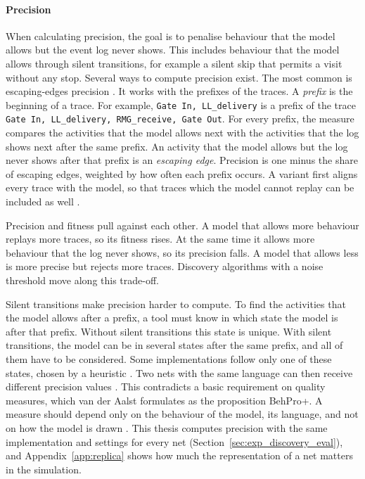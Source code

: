 \paragraph{Precision}
When calculating precision, the goal is to penalise behaviour that the model
allows but the event log never shows. This includes behaviour that the model
allows through silent transitions, for example a silent skip that permits a
visit without any stop. Several ways to compute precision exist. The most common
is escaping-edges precision \cite{MunozGama2010FreshLook}. It works with the
prefixes of the traces. A \emph{prefix} is the beginning of a trace. For
example, \texttt{Gate In, LL\_delivery} is a prefix of the trace \texttt{Gate In,
LL\_delivery, RMG\_receive, Gate Out}. For every prefix, the measure compares the
activities that the model allows next with the activities that the log shows
next after the same prefix. An activity that the model allows but the log never
shows after that prefix is an \emph{escaping edge}. Precision is one minus the
share of escaping edges, weighted by how often each prefix occurs. A variant
first aligns every trace with the model, so that traces which the model cannot
replay can be included as well \cite{Adriansyah2015Precision}.

Precision and fitness pull against each other. A model that allows more
behaviour replays more traces, so its fitness rises. At the same time it allows
more behaviour that the log never shows, so its precision falls. A model that
allows less is more precise but rejects more traces. Discovery algorithms with a
noise threshold move along this trade-off.

Silent transitions make precision harder to compute. To find the activities
that the model allows after a prefix, a tool must know in which state the model
is after that prefix. Without silent transitions this state is unique. With
silent transitions, the model can be in several states after the same prefix,
and all of them have to be considered. Some implementations follow only one of
these states, chosen by a heuristic \cite{MunozGama2010FreshLook}. Two nets with
the same language can then receive different precision values
\cite{Tax2018Imprecisions}. This contradicts a basic requirement on quality
measures, which van der Aalst formulates as the proposition BehPro+. A measure
should depend only on the behaviour of the model, its language, and not on how
the model is drawn \cite{vanderAalst2018Propositions}. This thesis computes precision
with the same implementation and settings for every net
(Section~\ref{sec:exp_discovery_eval}), and Appendix~\ref{app:replica} shows how much
the representation of a net matters in the simulation.

